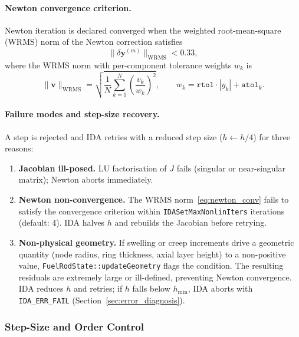 \begin{refsection}
\paragraph{Newton convergence criterion.} Newton iteration is declared converged when the weighted root-mean-square (WRMS) norm of the Newton correction satisfies
\begin{equation}
  \bigl\|\delta\mathbf{y}^{(m)}\bigr\|_\mathrm{WRMS} < 0.33,
  \label{eq:newton_conv}
\end{equation}
where the WRMS norm with per-component tolerance weights $w_k$ is
\begin{equation}
  \|\mathbf{v}\|_\mathrm{WRMS}
  = \sqrt{\frac{1}{N}\sum_{k=1}^{N}\left(\frac{v_k}{w_k}\right)^{\!2}},
  \qquad
  w_k = \mathtt{rtol}\cdot|y_k| + \mathtt{atol}_k.
  \label{eq:wrms}
\end{equation}

\paragraph{Failure modes and step-size recovery.} A step is rejected and IDA retries with a reduced step size ($h \leftarrow h/4$) for three reasons:
\begin{enumerate}
\item \textbf{Jacobian ill-posed.}  LU factorisation of $J$ fails (singular or near-singular matrix); Newton aborts immediately.
\item \textbf{Newton non-convergence.}  The WRMS norm~\eqref{eq:newton_conv} fails to satisfy the convergence criterion within \texttt{IDASetMaxNonlinIters} iterations (default: 4).  IDA halves $h$ and rebuilds the Jacobian before retrying.
\item \textbf{Non-physical geometry.}  If swelling or creep increments drive a geometric quantity (node radius, ring thickness, axial layer height) to a non-positive value, \texttt{FuelRodState::\allowbreak{}updateGeometry} flags the condition.  The resulting residuals are extremely large or ill-defined, preventing Newton convergence.  IDA reduces $h$ and retries; if $h$ falls below $h_\mathrm{min}$, IDA aborts with \texttt{IDA\_ERR\_FAIL} (Section~\ref{sec:error_diagnosis}).
\end{enumerate}

\subsubsection{Step-Size and Order Control}
\label{subsec:step_control}


\end{refsection}
